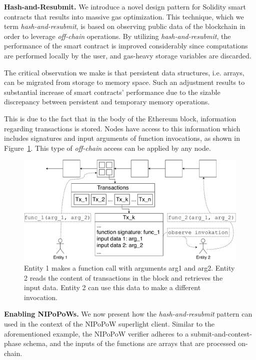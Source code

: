 \noindent \textbf{Hash-and-Resubmit.} We introduce a novel design pattern for
Solidity smart contracts that results into massive gas optimization. This
technique, which we term \emph{hash-and-resubmit}, is based on observing public
data of the blockchain in order to leverage \emph{off-chain} operations. By
utilizing \emph{hash-and-resubmit}, the performance of the smart contract is
improved considerably since computations are performed locally by the user, and
gas-heavy storage variables are discarded.

The critical observation we make is that persistent data structures, i.e.
arrays, can be migrated from storage to memory space. Such an adjustment
results to substantial increase of smart contracts' performance due to the
sizable discrepancy between persistent and temporary memory operations.

This is due to the fact that in the body of
the Ethereum block, information regarding transactions is stored. Nodes have
access to this information which includes signatures and input arguments of
function invocations, as shown in Figure~\ref{fig:observe-tx}. This type of
\emph{off-chain} access can be applied by any node.

\begin{figure}[h]
    \begin{center}
        \includegraphics[width=1\columnwidth]{figures/observer-tx.pdf}
    \end{center}
    \caption{Entity 1 makes a function call with arguments arg1 and arg2.
    Entity 2 reads the content of transactions in the block and retrieves the
    input data. Entity 2 can use this data to make a different invocation.}
    \label{fig:observe-tx}
\end{figure}

\noindent \textbf{Enabling NIPoPoWs.} We now present how the
\emph{hash-and-resubmit} pattern can used in the context of the NIPoPoW
superlight client. Similar to the aforementioned example, the NIPoPoW verifier
adheres to a submit-and-contest-phase schema, and the inputs of the functions
are arrays that are processed on-chain.

